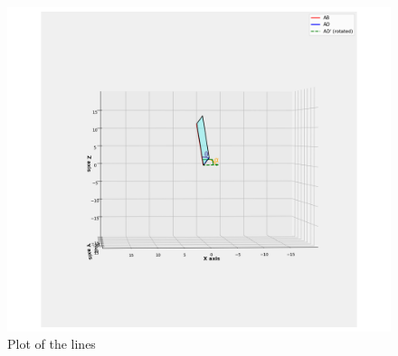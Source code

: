 \documentclass[journal]{IEEEtran}
\theoremstyle{remark}
\begin{document}
\begin{figure}[H]
    \centering
    \includegraphics[width=1\columnwidth]{figs/plot2.png}
     \caption{Plot of the lines}
   \label{fig:placeholder_1}
\end{figure}

 
\end{document}
